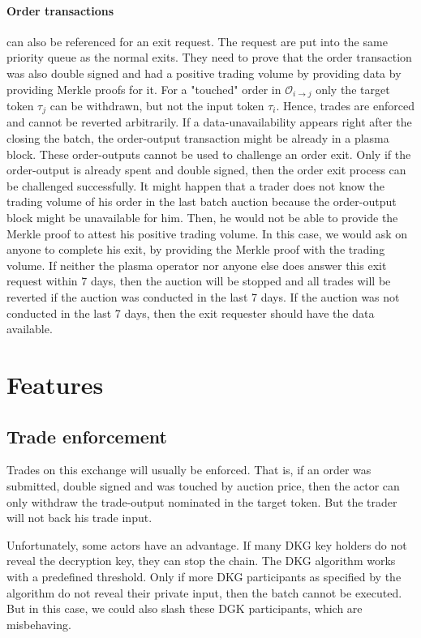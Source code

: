 \documentclass[11pt,parskip=full]{scrartcl}%
\def\pO{\mathcal{O}}
\def\ra{\rightarrow}
\begin{document}
\paragraph{Order transactions} can also be referenced for an exit request. The request are put into the same priority queue as the normal exits. They need to prove that the order transaction was also double signed and had a positive trading volume by providing data by providing Merkle proofs for it.
For a "touched" order in $\pO_{i\ra j}$ only the target token $\tau_j$ can be withdrawn, but not the input token $\tau_i$. 
Hence, trades are enforced and cannot be reverted arbitrarily. 
If a data-unavailability appears right after the closing the batch, the order-output transaction might be already in a plasma block. 
These order-outputs cannot be used to challenge an order exit. 
Only if the order-output is already spent and double signed, then the order exit process can be challenged successfully. 
It might happen that a trader does not know the trading volume of his order in the last batch auction because the order-output block might be unavailable for him. 
Then, he would not be able to provide the Merkle proof to attest his positive trading volume. 
In this case, we would ask on anyone to complete his exit, by providing the Merkle proof with the trading volume. 
If neither the plasma operator nor anyone else does answer this exit request within 7 days, then the auction will be stopped and all trades will be reverted if the auction was conducted in the last 7 days. If the auction was not conducted in the last 7 days, then the exit requester should have the data available.


\newpage

\section{Features}

\subsection{Trade enforcement}
Trades on this exchange will usually be enforced. 
That is, if an order was submitted, double signed and was touched by auction price, then the actor can only withdraw the trade-output nominated in the target token. 
But the trader will not back his trade input. 

Unfortunately, some actors have an advantage.
If many DKG key holders do not reveal the decryption key, they can stop the chain. 
The DKG algorithm works with a predefined threshold. 
Only if more DKG participants as specified by the algorithm do not reveal their private input, then the batch cannot be executed. 
But in this case, we could also slash these DGK participants, which are misbehaving. 
\end{document}
